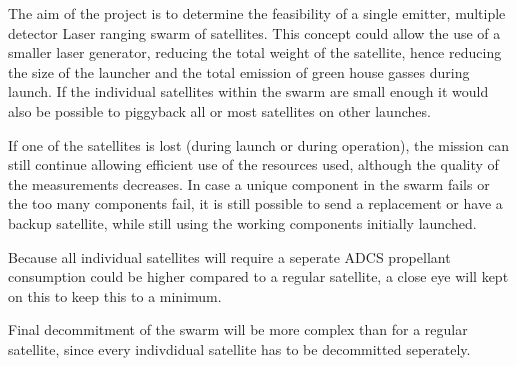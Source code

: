 The aim of the project is to determine the feasibility of a single emitter, multiple detector Laser ranging swarm of satellites. This concept could allow the use of a smaller laser generator, reducing the total weight of the satellite, hence reducing the size of the launcher and the total emission of green house gasses during launch. If the individual satellites within the swarm are small enough it would also be possible to piggyback all or most satellites on other launches. 

If one of the satellites is lost (during launch or during operation), the mission can still continue allowing efficient use of the resources used, although the quality of the measurements decreases. In case a unique component in the swarm fails or the too many components fail, it is still possible to send a replacement or have a backup satellite, while still using the working components initially launched.

Because all individual satellites will require a seperate ADCS propellant consumption could be higher compared to a regular satellite, a close eye will kept on this to keep this to a minimum.

Final decommitment of the swarm will be more complex than for a regular satellite, since every indivdidual satellite has to be decommitted seperately.